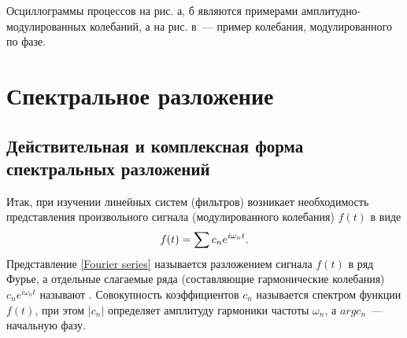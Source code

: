 




%

Осциллограммы процессов на рис. а, б являются примерами амплитудно-модулированных колебаний, а на рис. в~--- пример
колебания, модулированного по фазе.

\section{Спектральное разложение}

\subsection{Действительная и комплексная форма спектральных разложений}

Итак, при изучении линейных систем (фильтров) возникает необходимость представления произвольного сигнала
(модулированного колебания) $f(t)$ в виде
\begin{equation}
	\eqmark{Fourier series}
	f(t)=\sum c_n e^{i\omega_n t}.
\end{equation}
Представление \eqref{Fourier series} называется разложением сигнала $f(t)$ в ряд Фурье, а отдельные слагаемые ряда (составляющие
гармонические колебания) $c_n e^{i\omega_n t}$ называют . Совокупность коэффициентов $c_n$ называется
спектром функции $f(t)$, при этом $|c_n|$ определяет амплитуду гармоники частоты $\omega_n$, а $arg c_n$~--- начальную
фазу.

